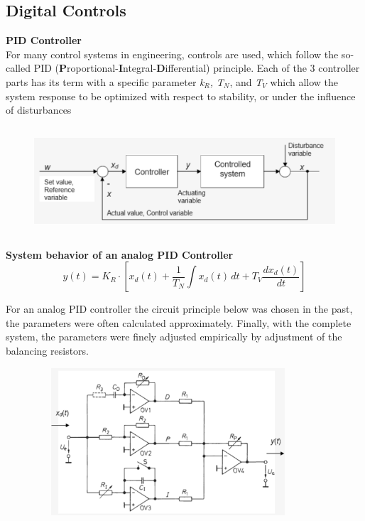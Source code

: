 \subsection{  Digital Controls}

{\rot\bf PID Controller}\\

For many control systems in engineering, controls are used, which follow the so-called PID (\textbf{P}roportional-\textbf{I}ntegral-\textbf{D}ifferential) principle. Each of the 3 controller parts has its term with a specific parameter \textit{k${}_{R}$,} \textit{T${}_{N}$}, and \textit{T${}_{V}$} which allow the system response to be optimized with respect to stability, or under the influence of disturbances

	\begin{figure}[h]
    \centering
    \includegraphics[width=14cm, height=4cm]{Images/image148.png}
    \label{fig:Fig }
    \end{figure}
\newpage
{\rot\bf System behavior of an analog PID Controller}\\

\begin{equation}
	 y(t)=K_{R} \cdot \left[x_{d} (t)+\frac{1}{T_{N} } \int x_{d} (t)\, dt+T_{V}  \frac{dx_{d} (t)}{dt} \right]
\label{EQ }
\end{equation}

For an analog PID controller the circuit principle below was chosen in the past, the parameters were often calculated approximately. Finally, with the complete system, the parameters were finely adjusted empirically by adjustment of the balancing resistors.

	\begin{figure}[h]
    \centering
    \includegraphics[width=10cm, height=5.5cm]{Images/image149.png}
    \label{fig:Fig }
    \end{figure}

